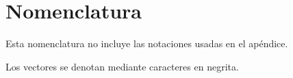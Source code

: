 \chapter*{Nomenclatura}

Esta nomenclatura no incluye las notaciones usadas en el apéndice.

Los vectores se denotan mediante caracteres en negrita. \\

\begin{table}[htbp]
\begin{tabular}{l l}
\end{tabular}
\end{table}


